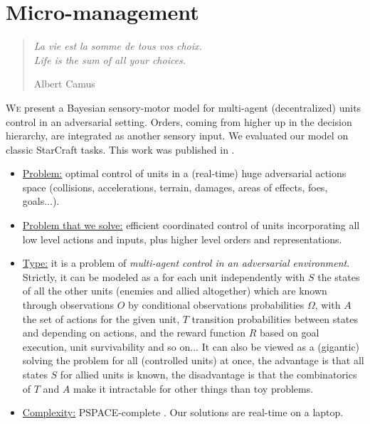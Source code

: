 \chapter{Micro-management}
\begin{quotation}
\noindent
\textit{La vie est la somme de tous vos choix.
\vspace{0.2cm}\\
Life is the sum of all your choices.}
\begin{flushright}Albert Camus\end{flushright}
\end{quotation}

\lettrine{W}{e} present a Bayesian sensory-motor model for multi-agent (decentralized) units control in an adversarial setting. Orders, coming from higher up in the decision hierarchy, are integrated as another sensory input. We evaluated our model on classic StarCraft  tasks. This work was published in \citep{SYNNAEVE:Micro}.

\chaptertoc

\begin{itemize}
\item \underline{Problem:} optimal control of units in a (real-time) huge adversarial actions space (collisions, accelerations, terrain, damages, areas of effects, foes, goals...).
\item \underline{Problem that we solve:} efficient coordinated control of units incorporating all low level actions and inputs, plus higher level orders and representations.
\item \underline{Type:} it is a problem of \textit{multi-agent control in an adversarial environment}. Strictly, it can be modeled as a  for each unit independently with $S$ the states of all the other units (enemies and allied altogether) which are known through observations $O$ by conditional observations probabilities $\Omega$, with $A$ the set of actions for the given unit, $T$ transition probabilities between states and depending on actions, and the reward function $R$ based on goal execution, unit survivability and so on... It can also be viewed as a (gigantic)  solving the problem for all (controlled units) at once, the advantage is that all states $S$ for allied units is known, the disadvantage is that the combinatorics of $T$ and $A$ make it intractable for other things than toy problems.
\item \underline{Complexity:} PSPACE-complete \citep{Papadimitriou87,GamingComplexity}. Our solutions are real-time on a laptop.
\end{itemize}

